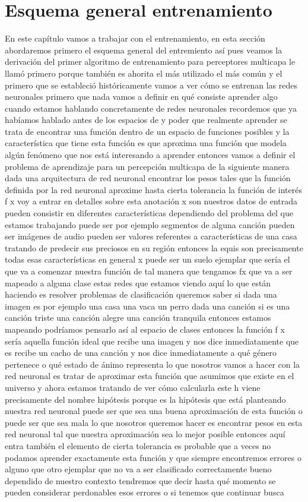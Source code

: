 \section{Esquema general entrenamiento}
 En este capítulo vamos a trabajar con el entrenamiento, en esta sección abordaremos primero el esquema general del entremiento así pues veamos la derivación del primer algoritmo de entrenamiento para perceptores multicapa le llamó primero porque también es ahorita el más utilizado el más común y el primero que se estableció históricamente vamos a ver cómo se entrenan las redes neuronales primero que nada vamos a definir en qué consiste aprender algo cuando estamos hablando concretamente de redes neuronales recordemos que ya habíamos hablado antes de los espacios de y poder que realmente aprender se trata de encontrar una función dentro de un espacio de funciones posibles y la característica que tiene esta función es que aproxima una función que modela algún fenómeno que nos está interesando a aprender entonces vamos a definir el problema de aprendizaje para un percepción multicapa de la siguiente manera dada una arquitectura de red neuronal encontrar los pesos tales que la función definida por la red neuronal aproxime hasta cierta tolerancia la función de interés f x voy a entrar en detalles sobre esta anotación x son nuestros datos de entrada pueden consistir en diferentes características dependiendo del problema del que estamos trabajando puede ser por ejemplo segmentos de alguna canción pueden ser imágenes de audio pueden ser valores referentes a características de una casa tratando de predecir sus preciosos en su región entonces la equis son precisamente todas esas características en general x puede ser un suelo ejemplar que sería el que va a comenzar nuestra función de tal manera que tengamos fx que va a ser mapeado a alguna clase estas redes que estamos viendo aquí lo que están haciendo es resolver problemas de clasificación queremos saber si dada una imagen es por ejemplo una casa una vaca un perro dada una canción si es una canción triste una canción alegre una canción tranquila entonces estamos mapeando podríamos pensarlo así al espacio de clases entonces la función f x sería aquella función ideal que recibe una imagen y nos dice inmediatamente que es recibe un cacho de una canción y nos dice inmediatamente a qué género pertenece o qué estado de ánimo representa lo que nosotros vamos a hacer con la red neuronal es tratar de aproximar esta función que asumimos que existe en el universo y ahora estamos tratando de ver cómo calcularla este h viene precisamente del nombre hipótesis porque es la hipótesis que está planteando nuestra red neuronal puede ser que sea una buena aproximación de esta función o puede ser que sea mala lo que nosotros queremos hacer es encontrar pesos en esta red neuronal tal que nuestra aproximación sea lo mejor posible entonces aquí entra también el elemento de cierta tolerancia es probable que a veces no podamos aprender exactamente esta función y que siempre encontremos errores o alguno que otro ejemplar que no va a ser clasificado correctamente bueno dependido de nuestro contexto tendremos que decir hasta qué momento se pueden considerar perdonables esos errores o si tenemos que continuar busca 